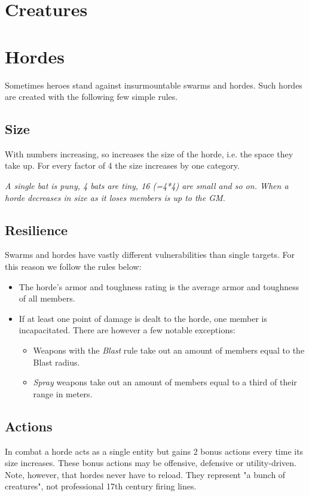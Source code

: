 \documentclass[12pt,a4paper,openany]{book}
\begin{document}
	\section{Creatures}
	

	\section{Hordes}
	Sometimes heroes stand against insurmountable swarms and hordes. Such hordes are created with the following few simple rules.
	
	\subsection*{Size}
	With numbers increasing, so increases the size of the horde, i.e. the space they take up. For every factor of 4 the size increases by one category.
	\begin{exampleblock}
		\itshape A single bat is puny, 4 bats are tiny, 16 (=4*4) are small and so on. When a horde decreases in size as it loses members is up to the GM.
	\end{exampleblock}
	
	\subsection*{Resilience}
	Swarms and hordes have vastly different vulnerabilities than single targets. For this reason we follow the rules below:
	\begin{itemize}
		\setlength\itemsep{-8mm} \vspace{-8mm}
		\item The horde's armor and toughness rating is the average armor and toughness of all members.
		\item If at least one point of damage is dealt to the horde, one member is incapacitated. There are however a few notable exceptions:
			\begin{itemize}
				\setlength\itemsep{-8mm} \vspace{-8mm}
				\item Weapons with the \emph{Blast} rule take out an amount of members equal to the Blast radius.
				\item \emph{Spray} weapons take out an amount of members equal to a third of their range in meters.
			\end{itemize}
	\end{itemize}
	
	\subsection*{Actions}
	In combat a horde acts as a single entity but gains 2 bonus actions every time its size increases. These bonus actions may be offensive, defensive or utility-driven. \\
	Note, however, that hordes never have to reload. They represent "a bunch of creatures", not professional 17th century firing lines.
	
\end{document}

